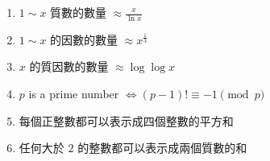 \begin{enumerate}
    \item $1 \sim x$ 質數的數量 $\approx \frac{x}{\ln x}$
    \item $1 \sim x$ 的因數的數量 $\approx x^\frac{1}{3}$
    \item $x$ 的質因數的數量 $\approx \log{\log{x}}$
    \item $p$ is a prime number $\Leftrightarrow (p-1)! \equiv -1  \pmod{p}$
    \item 每個正整數都可以表示成四個整數的平方和
    \item 任何大於 $2$ 的整數都可以表示成兩個質數的和
\end{enumerate}